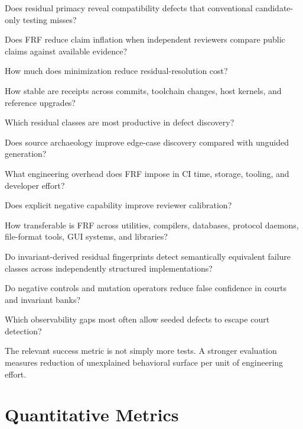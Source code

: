 \documentclass[11pt,a4paper]{article}
\newcommand{\frf}{\textsc{FRF}}
\begin{document}
\begin{description}[leftmargin=1.2cm,style=nextline]
\item[RQ1.] Does residual primacy reveal compatibility defects that conventional candidate-only testing misses?
\item[RQ2.] Does \frf{} reduce claim inflation when independent reviewers compare public claims against available evidence?
\item[RQ3.] How much does minimization reduce residual-resolution cost?
\item[RQ4.] How stable are receipts across commits, toolchain changes, host kernels, and reference upgrades?
\item[RQ5.] Which residual classes are most productive in defect discovery?
\item[RQ6.] Does source archaeology improve edge-case discovery compared with unguided generation?
\item[RQ7.] What engineering overhead does \frf{} impose in CI time, storage, tooling, and developer effort?
\item[RQ8.] Does explicit negative capability improve reviewer calibration?
\item[RQ9.] How transferable is \frf{} across utilities, compilers, databases, protocol daemons, file-format tools, GUI systems, and libraries?
\item[RQ10.] Do invariant-derived residual fingerprints detect semantically equivalent failure classes across independently structured implementations?
\item[RQ11.] Do negative controls and mutation operators reduce false confidence in courts and invariant banks?
\item[RQ12.] Which observability gaps most often allow seeded defects to escape court detection?
\end{description}

The relevant success metric is not simply more tests. A stronger evaluation measures reduction of unexplained behavioral surface per unit of engineering effort.

\section{Quantitative Metrics}
\label{sec:metrics}
\end{document}
